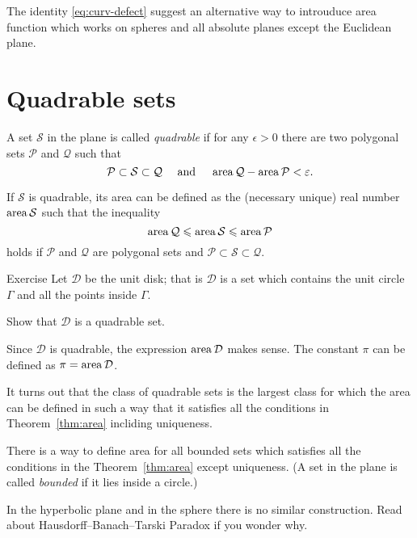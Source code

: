 The identity \ref{eq:curv-defect} suggest an alternative way to introuduce area function which works on spheres and all absolute planes except the Euclidean plane.

\section*{Quadrable sets}

A set $\mathcal{S}$ 
in the plane is called \emph{quadrable}
if for any $\epsilon>0$ there are two polygonal sets 
$\mathcal{P}$ and $\mathcal{Q}$
such that 
\[\mathcal{P}\subset\mathcal{S}\subset\mathcal{Q}
\ \ \ \ \text{and}\ \ \ \ 
\area\mathcal{Q}-\area\mathcal{P}<\epsilon.\]

If $\mathcal{S}$ is quadrable,
its area  can be defined 
as the (necessary unique) real number $\mathop{\rm area}\nolimits\mathcal{S}$ 
such that the inequality
\[\mathop{\rm area}\nolimits\mathcal{Q}\leqslant \mathop{\rm area}\nolimits\mathcal{S}\leqslant \mathop{\rm area}\nolimits\mathcal{P}
\]
holds if
$\mathcal{P}$ and $\mathcal{Q}$ are polygonal sets and $\mathcal{P}\subset\mathcal{S}\subset\mathcal{Q}$.

\begin{thm}{Exercise}\label{ex:circle-is-quadrable}
Let $\mathcal{D}$ be the unit disk;
that is $\mathcal{D}$ is a set which contains 
the unit circle $\Gamma$ and all the points inside $\Gamma$.

Show that $\mathcal{D}$ is a quadrable set.
\end{thm}

Since $\mathcal{D}$ is quadrable, 
the expression $\mathop{\rm area}\nolimits\mathcal{D}$ makes sense.
The constant $\pi$ can be defined as 
$\pi=\mathop{\rm area}\nolimits\mathcal{D}$.

\medskip

It turns out that the class of quadrable sets is the largest class for which 
the area can be defined in such a way that it satisfies all the conditions in Theorem~\ref{thm:area} incliding uniqueness.

There is a way to define area for all bounded sets
which satisfies all the conditions in the Theorem~\ref{thm:area} except uniqueness.
(A set in the plane is called \index{bounded set}\emph{bounded} if it lies inside a circle.)

In the hyperbolic plane and in the sphere
there is no similar construction.
Read about Hausdorff--Banach--Tarski Paradox
if you wonder why.


